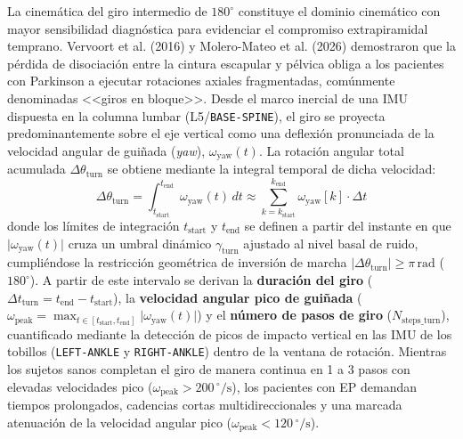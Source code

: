 \documentclass[12pt,a4paper]{article}
\begin{document}
La cinemática del giro intermedio de $180^\circ$ constituye el dominio cinemático con mayor sensibilidad diagnóstica para evidenciar el compromiso extrapiramidal temprano. Vervoort et al. (2016) y Molero-Mateo et al. (2026) demostraron que la pérdida de disociación entre la cintura escapular y pélvica obliga a los pacientes con Parkinson a ejecutar rotaciones axiales fragmentadas, comúnmente denominadas <<giros en bloque>>. Desde el marco inercial de una IMU dispuesta en la columna lumbar (L5/\texttt{BASE-SPINE}), el giro se proyecta predominantemente sobre el eje vertical como una deflexión pronunciada de la velocidad angular de guiñada (\emph{yaw}), $\omega_{\text{yaw}}(t)$. La rotación angular total acumulada $\Delta \theta_{\text{turn}}$ se obtiene mediante la integral temporal de dicha velocidad:
\[
\Delta \theta_{\text{turn}} = \int_{t_{\text{start}}}^{t_{\text{end}}} \omega_{\text{yaw}}(t) \, dt \approx \sum_{k=k_{\text{start}}}^{k_{\text{end}}} \omega_{\text{yaw}}[k] \cdot \Delta t
\]
donde los límites de integración $t_{\text{start}}$ y $t_{\text{end}}$ se definen a partir del instante en que $\lvert \omega_{\text{yaw}}(t) \rvert$ cruza un umbral dinámico $\gamma_{\text{turn}}$ ajustado al nivel basal de ruido, cumpliéndose la restricción geométrica de inversión de marcha $\lvert \Delta \theta_{\text{turn}} \rvert \ge \pi\,\text{rad}$ ($180^\circ$). A partir de este intervalo se derivan la \textbf{duración del giro} ($\Delta t_{\text{turn}} = t_{\text{end}} - t_{\text{start}}$), la \textbf{velocidad angular pico de guiñada} ($\omega_{\text{peak}} = \max_{t \in [t_{\text{start}}, t_{\text{end}}]} \lvert \omega_{\text{yaw}}(t) \rvert$) y el \textbf{número de pasos de giro} ($N_{\text{steps\_turn}}$), cuantificado mediante la detección de picos de impacto vertical en las IMU de los tobillos (\texttt{LEFT-ANKLE} y \texttt{RIGHT-ANKLE}) dentro de la ventana de rotación. Mientras los sujetos sanos completan el giro de manera continua en 1 a 3 pasos con elevadas velocidades pico ($\omega_{\text{peak}} > 200\,^\circ/\text{s}$), los pacientes con EP demandan tiempos prolongados, cadencias cortas multidireccionales y una marcada atenuación de la velocidad angular pico ($\omega_{\text{peak}} < 120\,^\circ/\text{s}$).
\end{document}
